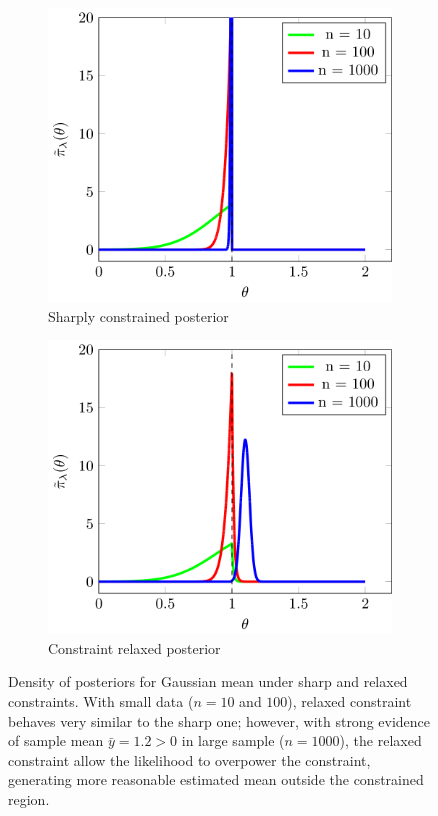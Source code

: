 \documentclass[10pt,fleqn]{article}
\DeclareMathOperator{\1}{\mathbbm{1}} \DeclareMathOperator{\bigO}{\mc O}
\begin{document}
\begin{figure}[H]
\begin{subfigure}[b]{0.45\textwidth}
 \includegraphics[width=1\textwidth]{gaussianInequalitySharp.png}
 \caption{Sharply constrained posterior}
\end{subfigure}
\begin{subfigure}[b]{0.45\textwidth}
 \includegraphics[width=1\textwidth]{gaussianInequalityRelaxed.png}
 \caption{Constraint relaxed posterior}
\end{subfigure}
 \caption{Density of posteriors for Gaussian mean under sharp and relaxed constraints. With small data ($n=10$ and $100$), relaxed constraint behaves very similar to the sharp one; however, with strong evidence of sample mean $\bar y=1.2>0$ in large sample ($n=1000$), the relaxed constraint allow the likelihood to overpower the constraint, generating more reasonable estimated
 mean outside the constrained region.  \label{fig:gaussian_inequality}}
\end{figure}
\end{document}
